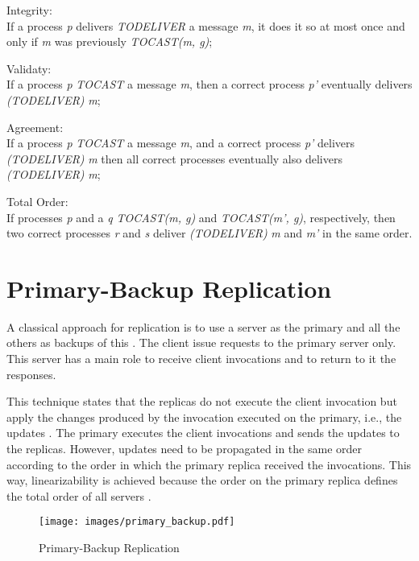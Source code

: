 \begin{description}
	\item Integrity:\\
		If a process \textit{p} delivers \textit{TODELIVER} a message \textit{m}, it does it so at most once and only if \textit{m} was previously \textit{TOCAST(m, g)}; 
	\item Validaty:\\
		If a process \textit{p} \textit{TOCAST} a message \textit{m}, then a correct process \textit{p'} eventually delivers \textit{(TODELIVER)} \textit{m};	
	\item Agreement:\\
		If a process \textit{p} \textit{TOCAST} a message \textit{m}, and a correct process \textit{p'} delivers \textit{(TODELIVER)} \textit{m} then all correct processes eventually also delivers \textit{(TODELIVER)} \textit{m}; 
	\item Total Order:\\
		If processes \textit{p} and a \textit{q} \textit{TOCAST(m, g)} and \textit{TOCAST(m', g)}, respectively, then two correct processes \textit{r} and \textit{s} deliver \textit{(TODELIVER)} \textit{m} and \textit{m'} in the same order.
		
\end{description}


\section{Primary-Backup Replication}

A classical approach for replication is to use a server as the primary and all the others as backups of this \cite{Al93theprimary-backup}. The client issue requests to the primary server only. This server has a main role to receive client invocations and to return to it the responses.

This technique states that the replicas do not execute the client invocation but apply the changes produced by the invocation executed on the primary, i.e., the updates \cite{Wiesmann:2000p556}. The primary executes the client invocations and sends the updates to the replicas. However, updates need to be propagated in the same order according to the order in which the primary replica received the invocations. This way, linearizability is achieved because the order on the primary replica defines the total order of all servers \cite{Guerraoui:1997p555}.

\begin{figure}[t]
\centering    
\texttt{[image: images/primary\_backup.pdf]}
\caption{Primary-Backup Replication}
\label{fig:primary_backup}
\end{figure}

